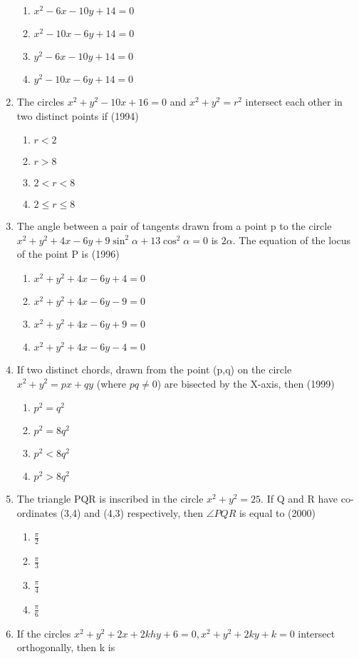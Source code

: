 \documentclass[12pt]{article}
\begin{document}
\begin{enumerate}
\begin{enumerate}
\item  $x^2-6x-10y+14=0$
\item  $x^2-10x-6y+14=0$
\item  $y^2-6x-10y+14=0$
\item  $y^2-10x-6y+14=0$
\end{enumerate}
\item The circles $x^2+y^2-10x+16=0$ and $x^2+y^2=r^2$ intersect each other in two distinct points if (1994)
\begin{enumerate}
\item $r<2$
\item $r>8$
\item $2<r<8$
\item $2\le r\le 8$
\end{enumerate}
\item The angle between a pair of tangents drawn from a point p to the circle $x^2+y^2+4x-6y+9\sin^2\alpha+13\cos^2\alpha=0$ is  $2\alpha$. The equation of the locus of the point P is (1996)
\begin{enumerate}
\item $x^2+y^2+4x-6y+4=0$
\item $x^2+y^2+4x-6y-9=0$
\item $x^2+y^2+4x-6y+9=0$
\item $x^2+y^2+4x-6y-4=0$
\end{enumerate}
\item If two distinct chords, drawn from the point (p,q) on the circle $x^2+y^2=px+qy$ (where $pq\neq 0$) are bisected by the X-axis, then (1999)
\begin{enumerate}
\item $p^2=q^2$
\item $p^2=8q^2$
\item $p^2<8q^2$
\item $p^2>8q^2$
\end{enumerate}
\item The triangle PQR is inscribed in the circle $x^2+y^2=25$. If Q and R have co-ordinates (3,4) and (4,3) respectively, then $\angle PQR$ is equal to (2000)
\begin{enumerate}
\item $\frac{\pi}{2}$
\item $\frac{\pi}{3}$
\item $\frac{\pi}{4}$
\item $\frac{\pi}{6}$
\end{enumerate}
\item If the circles $x^2+y^2+2x+2khy+6=0,x^2+y^2+2ky+k=0$ intersect orthogonally, then k is

\end{enumerate}
\end{document}

